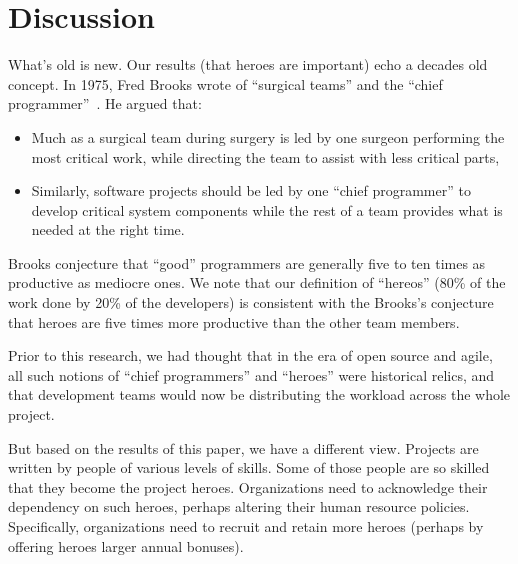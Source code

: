 \documentclass[sigconf]{acmart}
\newcommand{\bi}{\begin{itemize}[leftmargin=0.4cm]}
\newcommand{\ei}{\end{itemize}}
\theoremstyle{break}
\begin{document}
\section{Discussion}
\label{sec:discuss}
What's old is new. Our results (that heroes
are important) echo a decades old concept.
In 1975, Fred Brooks wrote of  ``surgical teams'' and the ``chief programmer''~\cite{brooks1975mythical}.
He argued that:
\bi
\item
Much as a surgical team during surgery is led by one surgeon performing the most critical work, while directing the team to assist with less critical parts,
\item
Similarly, software projects should be led by one ``chief programmer'' to  develop critical system components while the rest of a team provides what is needed at the right time. 
\ei
 Brooks conjecture that ``good'' programmers are generally five to ten times as productive as mediocre ones. We note that our definition of ``hereos'' (80\% of the work done by 20\% of the developers) is consistent with the Brooks's conjecture that heroes are  five times more productive than the other team members.
 
 Prior to this research, we had thought that in the era of open source and agile, all such notions of ``chief programmers'' and ``heroes'' were historical relics, and that development teams would now be distributing the workload across the whole project. 
 
 But based on the results of this paper, we have a different view. Projects are written by people of various levels of skills. Some of those people are so skilled that they become the project heroes. Organizations need to acknowledge their dependency on such heroes, perhaps altering their human resource policies. Specifically,  organizations need to recruit and retain more heroes (perhaps by offering heroes larger annual bonuses).





\end{document}
